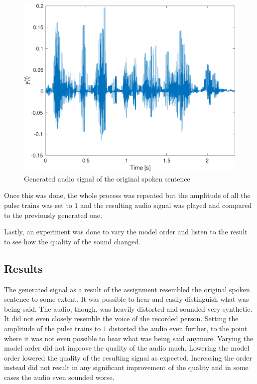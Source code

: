 \documentclass{IEEEtran}
\begin{document}
\begin{figure}[h]
  \centering
  \captionsetup{justification=centering}

  \includegraphics[width=0.8\columnwidth]{pictures/vim_gen.pdf}
  \caption{Generated audio signal of the original spoken sentence}
  \label{3:genvim}

\end{figure}

Once this was done, the whole process was repeated but the amplitude
of all the pulse trains was set to $1$ and the resulting audio signal
was played and compared to the previously generated one.

Lastly, an experiment was done to vary the model order and listen to
the result to see how the quality of the sound changed.

\subsection{Results}
The generated signal as a result of the assignment resembled the
original spoken sentence to some extent. It was possible to hear and
easily distinguish what was being said. The audio, though, was heavily
distorted and sounded very synthetic. It did not even closely resemble
the voice of the recorded person. Setting the amplitude of the pulse trains
to $1$ distorted the audio even further, to the point where it was not
even possible to hear what was being said anymore. Varying the model order
did not improve the quality of the audio much. Lowering the model order
lowered the quality of the resulting signal as expected. Increasing the
order instead did not result in any significant improvement of the
quality and in some cases the audio even sounded worse.
\end{document}
